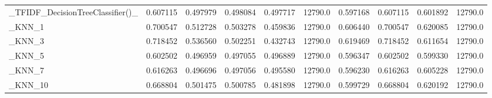 \begin{tabular}{lrrrrrrrrr}
\_TFIDF\_DecisionTreeClassifier()\_                   &  0.607115 &         0.497979 &      0.498084 &        0.497717 &        12790.0 &            0.597168 &         0.607115 &           0.601892 &           12790.0 \\
\_KNN\_1                                             &  0.700547 &         0.512728 &      0.503278 &        0.459836 &        12790.0 &            0.606440 &         0.700547 &           0.620085 &           12790.0 \\
\_KNN\_3                                             &  0.718452 &         0.536560 &      0.502251 &        0.432743 &        12790.0 &            0.619469 &         0.718452 &           0.611654 &           12790.0 \\
\_KNN\_5                                             &  0.602502 &         0.496959 &      0.497055 &        0.496889 &        12790.0 &            0.596347 &         0.602502 &           0.599330 &           12790.0 \\
\_KNN\_7                                             &  0.616263 &         0.496696 &      0.497056 &        0.495580 &        12790.0 &            0.596230 &         0.616263 &           0.605228 &           12790.0 \\
\_KNN\_10                                            &  0.668804 &         0.501475 &      0.500785 &        0.481898 &        12790.0 &            0.599729 &         0.668804 &           0.620192 &           12790.0 \\
\bottomrule
\end{tabular}
